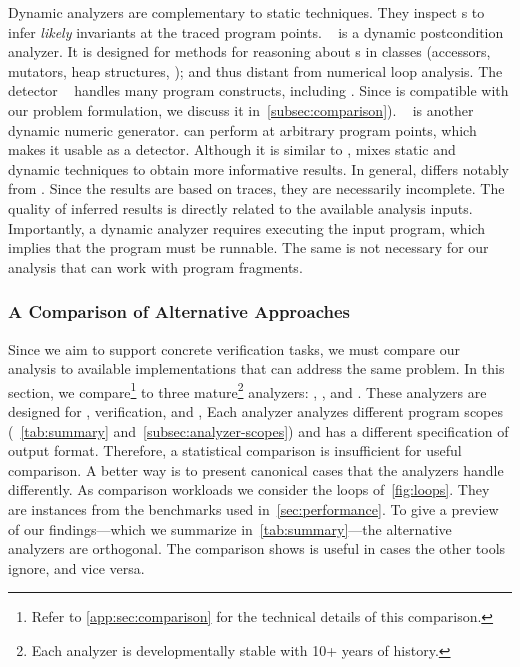 Dynamic analyzers are complementary to static techniques. They inspect s to infer \emph{likely}
invariants at the traced program points.
~\cite{molina2021} is a dynamic postcondition analyzer. It is
designed for  methods for reasoning about s in
classes (accessors, mutators, heap structures, \etc); and thus distant from
numerical loop analysis. The  detector
~\cite{ernst2007} handles many program constructs, including
. Since  is compatible with our problem
formulation, we discuss it in~\autoref{subsec:comparison}).
~\cite{nguyen2014} is another dynamic numeric 
generator.  can perform  at arbitrary program
points, which makes it usable as a  detector. Although it is
similar to ,  mixes static and dynamic techniques to obtain
more informative results. In general,  differs
notably from . Since the results are based on
traces, they are necessarily
incomplete. The quality of inferred results is directly
related to the available analysis inputs. Importantly, a dynamic analyzer
requires executing the input program, which implies that the program must be
runnable. The same is not necessary for our analysis that can work with program
fragments.

\subsubsection{A Comparison of Alternative Approaches}
\label{subsec:comparison}

Since we aim to support concrete verification tasks, we must compare our
analysis to available implementations that can address the same problem. In this
section, we compare\footnote{Refer to \autoref{app:sec:comparison} for the
technical details of this comparison.} \ndx{\impl} to three mature\footnote{Each
analyzer is developmentally stable with 10+ years of history.} analyzers:
, , and . These analyzers are designed for
, verification, and , \resp
Each analyzer analyzes different program scopes (\cf~\autoref{tab:summary}
and~\autoref{subsec:analyzer-scopes}) and has a different specification of
output format. Therefore, a statistical comparison is insufficient for useful
comparison. A better way is to present canonical cases that the analyzers handle
differently. As comparison workloads we consider the loops
of~\autoref{fig:loops}. They are instances from the benchmarks used
in~\autoref{sec:performance}. To give a preview of our findings---which we
summarize in~\autoref{tab:summary}---the alternative analyzers are {orthogonal}.
The comparison shows \ndx{\impl} is useful in cases the other tools ignore, and
vice versa.

